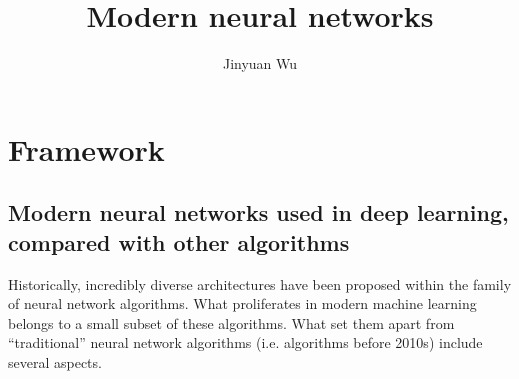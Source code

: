 \documentclass[hyperref, a4paper, 12pt]{report}
\title{Modern neural networks}
\author{Jinyuan Wu}
\begin{document}
\maketitle

\chapter{Framework}

\section{Modern neural networks used in deep learning, compared with other algorithms}
\label{sec:modern-network}

Historically, incredibly diverse architectures have been proposed within the family of neural network algorithms.
What proliferates in modern machine learning belongs to a small subset of these algorithms.
What set them apart from ``traditional'' neural network algorithms
(i.e. algorithms before 2010s) include several aspects.
\end{document}
